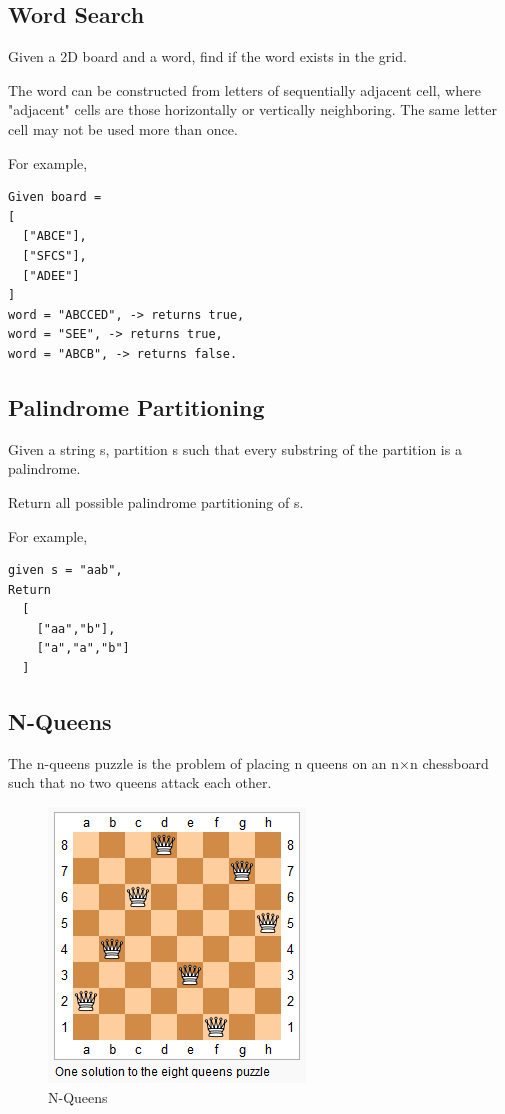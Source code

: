\documentclass[11pt]{book}
\begin{document}
\subsection{Word Search}
\label{sec-16-4-5}
Given a 2D board and a word, find if the word exists in the grid.

The word can be constructed from letters of sequentially adjacent cell, where "adjacent" cells are those horizontally or vertically neighboring. The same letter cell may not be used more than once.

For example,
\lstset{language=java,label= ,caption= ,numbers=none}
\begin{lstlisting}
Given board =
[
  ["ABCE"],
  ["SFCS"],
  ["ADEE"]
]
word = "ABCCED", -> returns true,
word = "SEE", -> returns true,
word = "ABCB", -> returns false.
\end{lstlisting}
\subsection{Palindrome Partitioning}
\label{sec-16-4-6}
Given a string s, partition s such that every substring of the partition is a palindrome.

Return all possible palindrome partitioning of s.

For example, 
\lstset{language=java,label= ,caption= ,numbers=none}
\begin{lstlisting}
given s = "aab",
Return
  [
    ["aa","b"],
    ["a","a","b"]
  ]
\end{lstlisting}
\subsection{N-Queens}
\label{sec-16-4-7}
The n-queens puzzle is the problem of placing n queens on an n×n chessboard such that no two queens attack each other.
\begin{figure}[htb]
\centering
\includegraphics[width=.9\linewidth]{./pic/8-queens.png}
\caption{N-Queens}
\end{figure}
\end{document}

